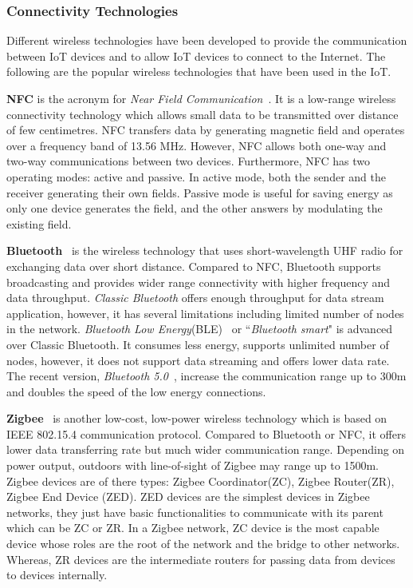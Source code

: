 \subsubsection{Connectivity Technologies}

Different wireless technologies have been developed to provide the communication between IoT devices and to allow IoT devices to connect to the Internet. 
The following are the popular wireless technologies that have been used in the IoT.

\textbf{NFC} is the acronym for \textit{Near Field Communication}~\citep{Want:2011}. It is a low-range wireless connectivity technology which allows small data to be transmitted over distance of few centimetres. 
NFC transfers data by generating magnetic field and operates over a frequency band of 13.56 MHz.
However, NFC allows both one-way and two-way communications between two devices.
Furthermore, NFC has two operating modes: active and passive.
In active mode, both the sender and the receiver  generating their own fields.
Passive mode is useful for saving energy as only one device generates the field, and the other answers by modulating the existing field.

\textbf{Bluetooth}~\citep{bluetooth} is the wireless technology that uses short-wavelength UHF radio for exchanging data over short distance.
Compared to NFC, Bluetooth supports broadcasting and provides wider range connectivity with higher frequency and data throughput. 
\textit{Classic Bluetooth} offers enough throughput for data stream application, however, it has several limitations including limited number of nodes in the network.
\textit{Bluetooth Low Energy}(BLE)~\citep{Heydon:2013} or ``\textit{Bluetooth smart}" is advanced over Classic Bluetooth.
It consumes less energy, supports unlimited number of nodes, however, it does not support data streaming and offers lower data rate.
The recent version, \textit{Bluetooth 5.0}~\citep{Collatta:2018}, increase the communication range up to 300m and doubles the speed of the low energy connections. 

\textbf{Zigbee}~\citep{Alliance:2009} is another low-cost, low-power wireless technology which is based on IEEE 802.15.4 communication protocol.
Compared to Bluetooth or NFC, it offers lower data transferring rate but  much wider communication range.
Depending on power output, outdoors with line-of-sight of Zigbee may range up to 1500m.
Zigbee devices are of there types: Zigbee Coordinator(ZC), Zigbee Router(ZR), Zigbee End Device (ZED).
ZED devices are the simplest devices in Zigbee networks, they just have basic functionalities to communicate with its parent which can be ZC or ZR. 
In a Zigbee network, ZC device is the most capable device whose roles are the root of the network and the bridge to other networks.
Whereas, ZR devices are the intermediate routers for passing data from devices to devices internally. 

